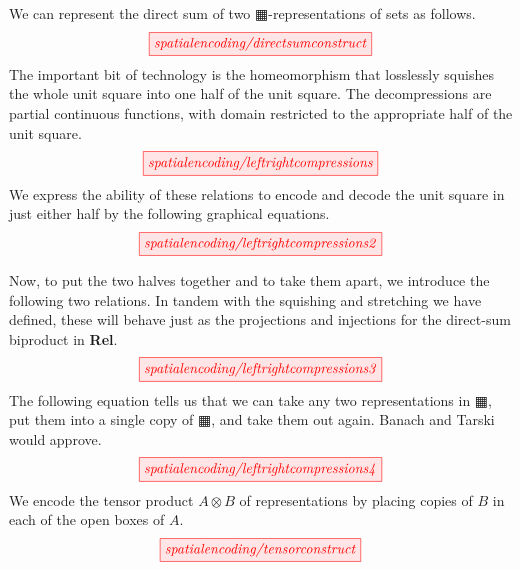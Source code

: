 \begin{myboxB}
\begin{construction}
We can represent the direct sum of two $\squarehvfill$-representations of sets as follows.
\[\scalebox{1}{\tikzfig{spatialencoding/directsumconstruct}}\]
The important bit of technology is the homeomorphism that losslessly squishes the whole unit square into one half of the unit square. The decompressions are partial continuous functions, with domain restricted to the appropriate half of the unit square.
\[\scalebox{1}{\tikzfig{spatialencoding/leftrightcompressions}}\]
We express the ability of these relations to encode and decode the unit square in just either half by the following graphical equations.
\[\scalebox{1}{\tikzfig{spatialencoding/leftrightcompressions2}}\]
\end{construction}
\end{myboxB}

\begin{myboxB}
Now, to put the two halves together and to take them apart, we introduce the following two relations. In tandem with the squishing and stretching we have defined, these will behave just as the projections and injections for the direct-sum biproduct in \textbf{Rel}.
\[\scalebox{1}{\tikzfig{spatialencoding/leftrightcompressions3}}\]
The following equation tells us that we can take any two representations in $\squarehvfill$, put them into a single copy of $\squarehvfill$, and take them out again. Banach and Tarski would approve.
\[\scalebox{1}{\tikzfig{spatialencoding/leftrightcompressions4}}\]
We encode the tensor product $A \otimes B$ of representations by placing copies of $B$ in each of the open boxes of $A$.
\[\scalebox{1}{\tikzfig{spatialencoding/tensorconstruct}}\]
\end{myboxB}

\clearpage

